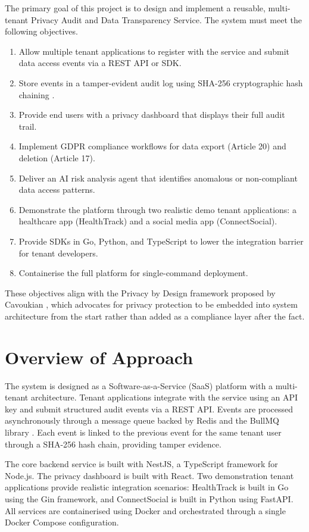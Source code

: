 \documentclass[a4paper,12pt,onecolumn]{report}
\begin{document}
The primary goal of this project is to design and implement a reusable, multi-tenant Privacy Audit and Data Transparency Service.
The system must meet the following objectives.

\begin{enumerate}
    \item Allow multiple tenant applications to register with the service and submit data access events via a REST API or SDK.
    \item Store events in a tamper-evident audit log using SHA-256 cryptographic hash chaining \cite{hashchain}.
    \item Provide end users with a privacy dashboard that displays their full audit trail.
    \item Implement GDPR compliance workflows for data export (Article 20) and deletion (Article 17).
    \item Deliver an AI risk analysis agent that identifies anomalous or non-compliant data access patterns.
    \item Demonstrate the platform through two realistic demo tenant applications: a healthcare app (HealthTrack) and a social media app (ConnectSocial).
    \item Provide SDKs in Go, Python, and TypeScript to lower the integration barrier for tenant developers.
    \item Containerise the full platform for single-command deployment.
\end{enumerate}

These objectives align with the Privacy by Design framework proposed by Cavoukian \cite{cavoukian2009}, which advocates for privacy protection to be embedded into system architecture from the start rather than added as a compliance layer after the fact.

\section{Overview of Approach}

The system is designed as a Software-as-a-Service (SaaS) platform with a multi-tenant architecture.
Tenant applications integrate with the service using an API key and submit structured audit events via a REST API.
Events are processed asynchronously through a message queue backed by Redis and the BullMQ library \cite{microservices}.
Each event is linked to the previous event for the same tenant user through a SHA-256 hash chain, providing tamper evidence.

The core backend service is built with NestJS, a TypeScript framework for Node.js.
The privacy dashboard is built with React.
Two demonstration tenant applications provide realistic integration scenarios: HealthTrack is built in Go using the Gin framework, and ConnectSocial is built in Python using FastAPI.
All services are containerised using Docker and orchestrated through a single Docker Compose configuration.
\end{document}
